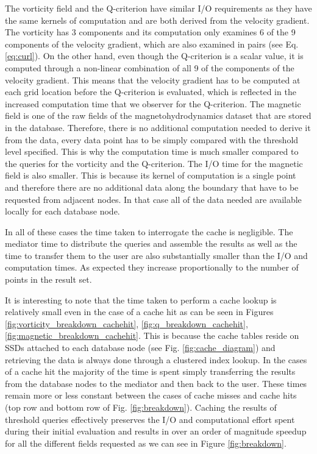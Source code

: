 \documentclass{sig-alternate}
\begin{document}
The vorticity field and the Q-criterion have similar I/O requirements as they
have the same kernels of computation and are both derived from the velocity gradient. The vorticity has 3 components and its computation only examines
6 of the 9 components of the velocity gradient, which are also examined in pairs (see Eq. \ref{eq:curl}). On the other hand, even though the Q-criterion is a
scalar value, it is computed through a non-linear combination of all 9 of the components of the velocity gradient. This means that the velocity gradient has
to be computed at each grid location before the Q-criterion is evaluated, which is reflected in the increased computation time that we observer for the
Q-criterion. The magnetic field is one of the raw fields of the magnetohydrodynamics dataset that are stored in the database. Therefore, there is no
additional computation needed to derive it from the data, every data point has to be simply compared with the threshold level specified. This is why the 
computation time is much smaller compared to the queries for the vorticity and the Q-criterion. The I/O time for the magnetic field is also smaller. This is
because its kernel of computation is a single point and therefore there are no additional data along the boundary that have to be requested from adjacent 
nodes. In that case all of the data needed are available locally for each database node.

In all of these cases the time taken to interrogate the cache is negligible. The mediator time to distribute the queries and assemble the results as well as the
time to transfer them to the user are also substantially smaller than the I/O and computation times. As expected they increase proportionally to the number
of points in the result set.

It is interesting to note that the time taken to perform a cache lookup is relatively small even in the case of a cache hit as can be seen in Figures 
\ref{fig:vorticity_breakdown_cachehit}, \ref{fig:q_breakdown_cachehit}, \ref{fig:magnetic_breakdown_cachehit}. This is because the cache tables reside on
SSDs attached to each database node (see Fig. \ref{fig:cache_diagram}) and retrieving the data is always done through a clustered index lookup.
In the cases of a cache hit the majority of the time is spent simply transferring the results from the database nodes to the mediator and then back to the user.
These times remain more or less constant between the cases of cache misses and cache hits (top row and bottom row of Fig. \ref{fig:breakdown}).
Caching the results of threshold queries
effectively preserves the I/O and computational effort spent during their initial evaluation and results in over an order of magnitude speedup for all the
different fields requested as we can see in Figure \ref{fig:breakdown}.
\end{document}
